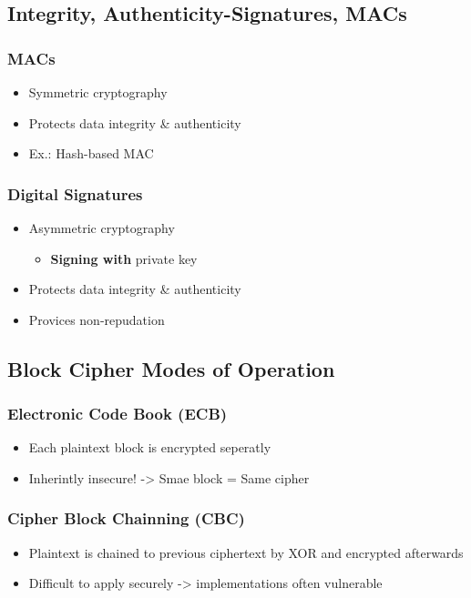 \subsection{Integrity, Authenticity-Signatures, MACs}
\subsubsection{MACs}
\begin{itemize}
  \item Symmetric cryptography
  \item Protects data integrity \& authenticity
  \item Ex.: Hash-based MAC
\end{itemize}

\subsubsection{Digital Signatures}
\begin{itemize}
  \item Asymmetric cryptography
    \begin{itemize}
      \item{\textbf{Signing with} private key}
    \end{itemize}
  \item{Protects data integrity \& authenticity}
  \item{Provices non-repudation}
\end{itemize}

\subsection{Block Cipher Modes of Operation}
\subsubsection{Electronic Code Book (ECB)}
\begin{itemize}
  \item{Each plaintext block is encrypted seperatly}
  \item{Inherintly insecure! -> Smae block = Same cipher}
\end{itemize}

\subsubsection{Cipher Block Chainning (CBC)}
\begin{itemize}
  \item Plaintext is chained to previous ciphertext by XOR and encrypted afterwards
  \item Difficult to apply securely -> implementations often vulnerable
\end{itemize}


